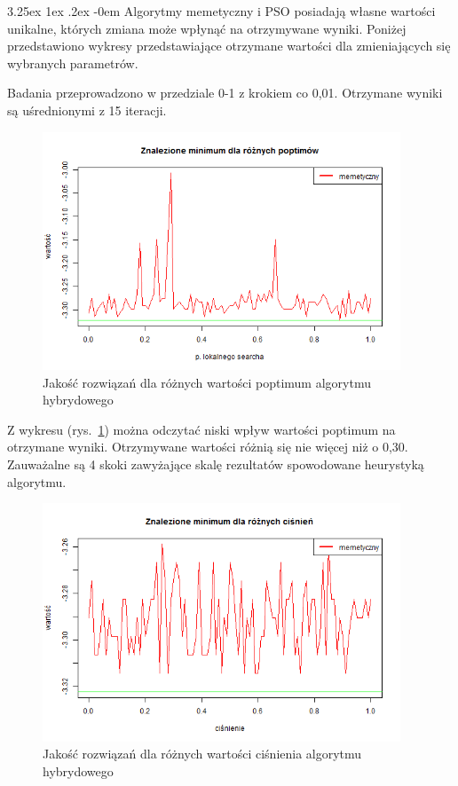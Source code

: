 \documentclass[11pt, a4paper]{article}
\makeatletter
\newcommand{\fbi}{\leavevmode{\parindent=1em\indent}}
\renewcommand\paragraph{\@startsection{paragraph}{5}{\z@}
  {3.25ex \@plus1ex \@minus.2ex}
  {-0em}
  {\normalfont\normalsize\bfseries}}
\makeatother
\begin{document}
\paragraph{}
Algorytmy memetyczny i PSO posiadają własne wartości unikalne, których zmiana może wpłynąć na otrzymywane wyniki. Poniżej przedstawiono wykresy przedstawiające otrzymane wartości dla zmieniających się wybranych parametrów.

\fbi
Badania przeprowadzono w przedziale 0-1 z krokiem co 0,01. Otrzymane wyniki są uśrednionymi z 15 iteracji.

\begin{figure}[H]
	\centering
	\includegraphics[width=0.95\textwidth]{./assets/Hartman6poptim.png}
	\caption{Jakość rozwiązań dla różnych wartości poptimum algorytmu hybrydowego}
	\label{fig:hybridpoptimum}
\end{figure}

\fbi
Z wykresu (rys.~\ref{fig:hybridpoptimum}) można odczytać niski wpływ wartości poptimum na otrzymane wyniki. Otrzymywane wartości różnią się nie więcej niż o 0,30. Zauważalne są 4 skoki zawyżające skalę rezultatów spowodowane heurystyką algorytmu.


\begin{figure}[H]
	\centering
	\includegraphics[width=0.95\textwidth]{./assets/Hartman6pressel.png}
	\caption{Jakość rozwiązań dla różnych wartości ciśnienia algorytmu hybrydowego}
	\label{fig:hybridpressel}
\end{figure}
\end{document}
